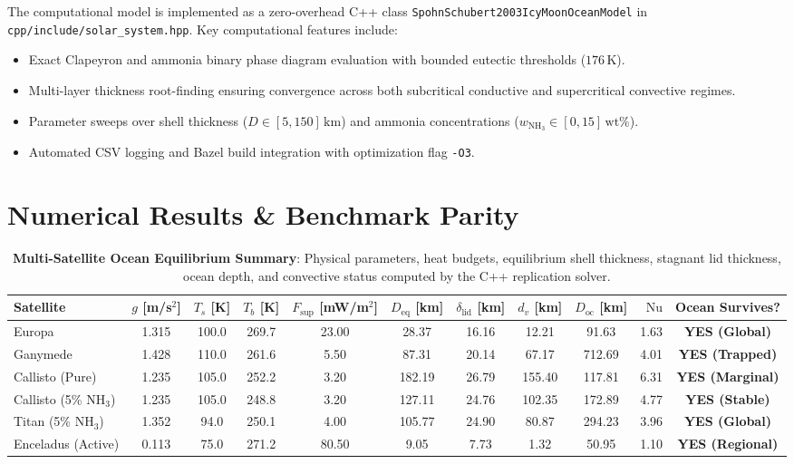 \documentclass[10pt,twocolumn,letterpaper]{article}
\begin{document}
The computational model is implemented as a zero-overhead C++ class \texttt{SpohnSchubert2003IcyMoonOceanModel} in \texttt{cpp/include/solar\_system.hpp}. Key computational features include:
\begin{itemize}
    \item Exact Clapeyron and ammonia binary phase diagram evaluation with bounded eutectic thresholds ($176\,\text{K}$).
    \item Multi-layer thickness root-finding ensuring convergence across both subcritical conductive and supercritical convective regimes.
    \item Parameter sweeps over shell thickness ($D \in [5, 150]\,\text{km}$) and ammonia concentrations ($w_{\mathrm{NH}_3} \in [0, 15]\,\text{wt}\%$).
    \item Automated CSV logging and Bazel build integration with optimization flag \texttt{-O3}.
\end{itemize}

\section{Numerical Results \& Benchmark Parity}

\begin{table}[t!]
\centering
\footnotesize
\setlength{\tabcolsep}{4.5pt}
\caption{\textbf{Multi-Satellite Ocean Equilibrium Summary}: Physical parameters, heat budgets, equilibrium shell thickness, stagnant lid thickness, ocean depth, and convective status computed by the C++ replication solver.}

\label{tab:summary}
\begin{tabular}{lccccccccrc}
\toprule
\textbf{Satellite} & \textbf{$g$ [m/s$^2$]} & \textbf{$T_s$ [K]} & \textbf{$T_b$ [K]} & \textbf{$F_{\mathrm{sup}}$ [mW/m$^2$]} & \textbf{$D_{\mathrm{eq}}$ [km]} & \textbf{$\delta_{\mathrm{lid}}$ [km]} & \textbf{$d_v$ [km]} & \textbf{$D_{\mathrm{oc}}$ [km]} & \textbf{$\mathrm{Nu}$} & \textbf{Ocean Survives?} \\
\midrule
Europa & 1.315 & 100.0 & 269.7 & 23.00 & 28.37 & 16.16 & 12.21 & 91.63 & 1.63 & \textbf{YES (Global)} \\
Ganymede & 1.428 & 110.0 & 261.6 & 5.50 & 87.31 & 20.14 & 67.17 & 712.69 & 4.01 & \textbf{YES (Trapped)} \\
Callisto (Pure) & 1.235 & 105.0 & 252.2 & 3.20 & 182.19 & 26.79 & 155.40 & 117.81 & 6.31 & \textbf{YES (Marginal)} \\
Callisto (5\% $\mathrm{NH}_3$) & 1.235 & 105.0 & 248.8 & 3.20 & 127.11 & 24.76 & 102.35 & 172.89 & 4.77 & \textbf{YES (Stable)} \\
Titan (5\% $\mathrm{NH}_3$) & 1.352 & 94.0 & 250.1 & 4.00 & 105.77 & 24.90 & 80.87 & 294.23 & 3.96 & \textbf{YES (Global)} \\
Enceladus (Active) & 0.113 & 75.0 & 271.2 & 80.50 & 9.05 & 7.73 & 1.32 & 50.95 & 1.10 & \textbf{YES (Regional)} \\
\bottomrule
\end{tabular}
\end{table}
\end{document}

